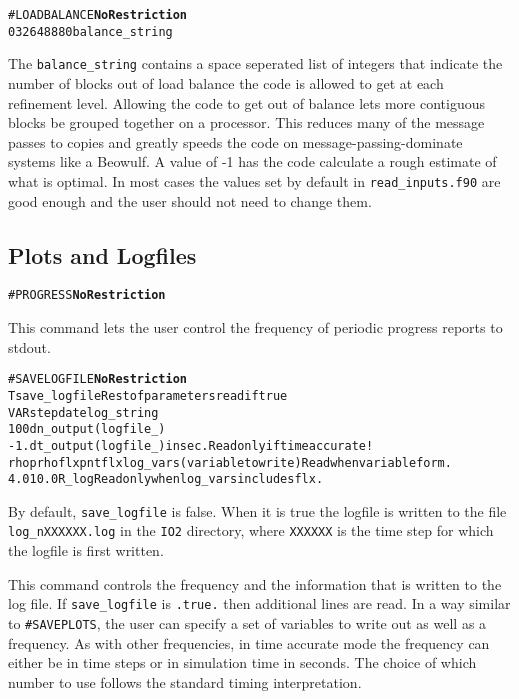 \begin{alltt}
#LOADBALANCE    \hfill {\bf No Restriction}
0 32 64 8 8 8 0        balance_string 
\end{alltt}

The {\tt balance\_string} contains a space seperated list of integers that
indicate the number of blocks out of load balance the code is allowed
to get at each refinement level.  Allowing the code to get out of
balance lets more contiguous blocks be grouped together on a processor.
This reduces many of the message passes to copies and greatly speeds the code
on message-passing-dominate systems like a Beowulf.  A value of -1
has the code calculate a rough estimate of what is optimal.  In most
cases the values set by default in {\tt read\_inputs.f90} are good enough and
the user should not need to change them.  
\ \ \\



\subsection{Plots and Logfiles \label{section:plot_logfiles}}

\begin{alltt}
#PROGRESS  \hfill {\bf No Restriction}
\end{alltt}

This command lets the user control the frequency of periodic progress
reports to stdout.
\ \ \\

\begin{alltt}
#SAVELOGFILE  \hfill {\bf No Restriction}
T                      save_logfile Rest of parameters read if true
VAR  step date         log_string
100                    dn_output(logfile_)
-1.                    dt_output(logfile_) in sec. Read only if time accurate!
rho p rhoflx pntflx    log_vars (variable to write) Read when variable form.
4.0  10.0              R_log  Read only when log_vars includes flx.
\end{alltt}

By default, {\tt save\_logfile} is false.  When it is true the logfile is written 
to the file {\tt log\_nXXXXXX.log} in the {\tt IO2} directory, where {\tt XXXXXX}
is the time step for which the logfile is first written. 

This command controls the frequency and the information that is written
to the log file.  If {\tt save\_logfile} is {\tt .true.} then additional
lines are read.  In a way similar to {\tt \#SAVEPLOTS}, the user
can specify a set of variables to write out as well as a frequency.
As with other frequencies, in time accurate mode the frequency can either
be in time steps or in simulation time in seconds.  The choice  of which
number to use follows the standard timing interpretation.

